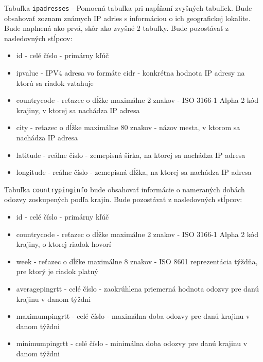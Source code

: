 Tabuľka \lstinline{ipadresses} - Pomocná tabuľka pri napĺňaní zvyšných tabuliek. Bude obsahovať zoznam známych IP adries s informáciou 
o ich geografickej lokalite. Bude naplnená ako prvá, skôr ako zvyšné 2 tabuľky. Bude pozostávať z nasledovných stĺpcov:
\begin{itemize}
    \item id - celé číslo - primárny kľúč
    \item ipvalue - IPV4 adresa vo formáte cidr - konkrétna hodnota IP adresy na ktorú sa riadok vzťahuje
    \item countrycode - reťazec o dĺžke maximálne 2 znakov - ISO 3166-1 Alpha 2 kód krajiny, v ktorej sa nachádza IP adresa
    \item city - reťazec o dĺžke maximálne 80 znakov - názov mesta, v ktorom sa nachádza IP adresa
    \item latitude - reálne číslo - zemepisná šírka, na ktorej sa nachádza IP adresa
    \item longitude - reálne číslo - zemepisná dĺžka, na ktorej sa nachádza IP adresa   
\end{itemize}

Tabuľka \lstinline{countrypinginfo} bude obsahovať 
informácie o nameraných dobách odozvy zoskupených podľa krajín. Bude pozostávať z nasledovných stĺpcov:
\begin{itemize}
    \item id - celé číslo - primárny kľúč
    \item countrycode - reťazec o dĺžke maximálne 2 znakov - ISO 3166-1 Alpha 2 kód krajiny, o ktorej riadok hovorí
    \item week - reťazec o dĺžke maximálne 8 znakov - ISO 8601 reprezentácia týždňa, pre ktorý je riadok platný
    \item averagepingrtt - celé číslo - zaokrúhlena priemerná hodnota odozvy pre danú krajinu v danom týždni
    \item maximumpingrtt - celé číslo - maximálna doba odozvy pre danú krajinu v danom týždni
    \item minimumpingrtt - celé číslo - minimálna doba odozvy pre danú krajinu v danom týždni
\end{itemize}

